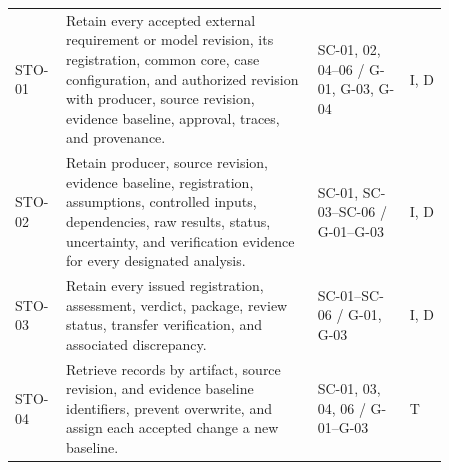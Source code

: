 \documentclass[11pt,a4paper]{article}
\begin{document}
\begin{longtable}{>{\raggedright\arraybackslash}p{0.07\linewidth} >{\raggedright\arraybackslash}p{0.52\linewidth} >{\raggedright\arraybackslash}p{0.19\linewidth} >{\raggedright\arraybackslash}p{0.08\linewidth}}
    STO-01 & Retain every accepted external requirement or model revision, its registration, common core, case configuration, and authorized revision with producer, source revision, evidence baseline, approval, traces, and provenance. & SC-01, 02, 04--06 / G-01, G-03, G-04 & I, D \\
    STO-02 & Retain producer, source revision, evidence baseline, registration, assumptions, controlled inputs, dependencies, raw results, status, uncertainty, and verification evidence for every designated analysis. & SC-01, SC-03--SC-06 / G-01--G-03 & I, D \\
    STO-03 & Retain every issued registration, assessment, verdict, package, review status, transfer verification, and associated discrepancy. & SC-01--SC-06 / G-01, G-03 & I, D \\
    STO-04 & Retrieve records by artifact, source revision, and evidence baseline identifiers, prevent overwrite, and assign each accepted change a new baseline. & SC-01, 03, 04, 06 / G-01--G-03 & T \\
    \bottomrule
\end{longtable}
\end{document}
